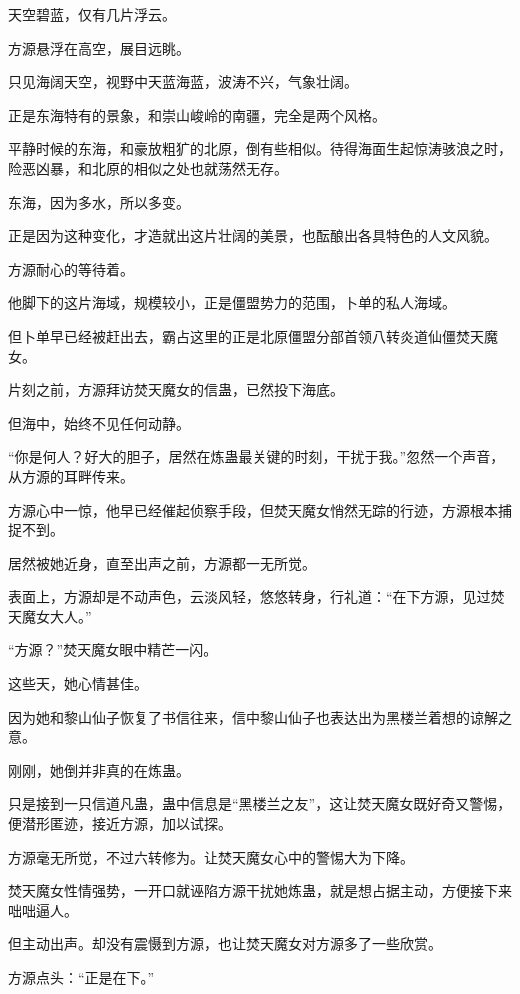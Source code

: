 
\begin{this_body}

天空碧蓝，仅有几片浮云。

方源悬浮在高空，展目远眺。

只见海阔天空，视野中天蓝海蓝，波涛不兴，气象壮阔。

正是东海特有的景象，和崇山峻岭的南疆，完全是两个风格。

平静时候的东海，和豪放粗犷的北原，倒有些相似。待得海面生起惊涛骇浪之时，险恶凶暴，和北原的相似之处也就荡然无存。

东海，因为多水，所以多变。

正是因为这种变化，才造就出这片壮阔的美景，也酝酿出各具特色的人文风貌。

方源耐心的等待着。

他脚下的这片海域，规模较小，正是僵盟势力的范围，卜单的私人海域。

但卜单早已经被赶出去，霸占这里的正是北原僵盟分部首领八转炎道仙僵焚天魔女。

片刻之前，方源拜访焚天魔女的信蛊，已然投下海底。

但海中，始终不见任何动静。

“你是何人？好大的胆子，居然在炼蛊最关键的时刻，干扰于我。”忽然一个声音，从方源的耳畔传来。

方源心中一惊，他早已经催起侦察手段，但焚天魔女悄然无踪的行迹，方源根本捕捉不到。

居然被她近身，直至出声之前，方源都一无所觉。

表面上，方源却是不动声色，云淡风轻，悠悠转身，行礼道：“在下方源，见过焚天魔女大人。”

“方源？”焚天魔女眼中精芒一闪。

这些天，她心情甚佳。

因为她和黎山仙子恢复了书信往来，信中黎山仙子也表达出为黑楼兰着想的谅解之意。

刚刚，她倒并非真的在炼蛊。

只是接到一只信道凡蛊，蛊中信息是“黑楼兰之友”，这让焚天魔女既好奇又警惕，便潜形匿迹，接近方源，加以试探。

方源毫无所觉，不过六转修为。让焚天魔女心中的警惕大为下降。

焚天魔女性情强势，一开口就诬陷方源干扰她炼蛊，就是想占据主动，方便接下来咄咄逼人。

但主动出声。却没有震慑到方源，也让焚天魔女对方源多了一些欣赏。

方源点头：“正是在下。”


\end{this_body}
